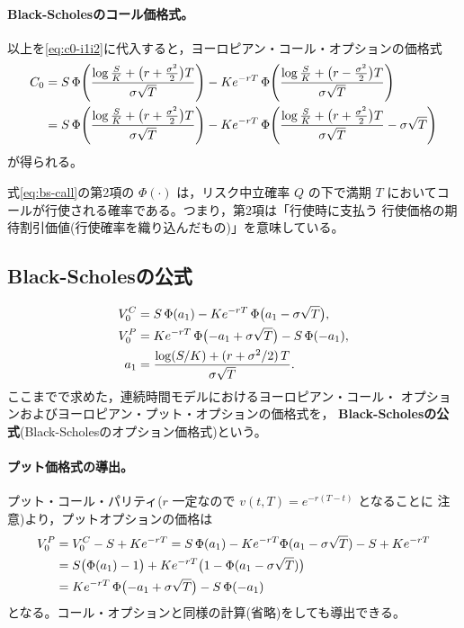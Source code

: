 \paragraph{Black-Scholesのコール価格式。}
以上を\eqref{eq:c0-i1i2}に代入すると，ヨーロピアン・コール・オプションの価格式
\begin{align}
C_0 &= S\,\Phi\Biggl(\frac{\log\frac{S}{K}
+ \bigl(r+\frac{\sigma^2}{2}\bigr)T}{\sigma\sqrt{T}}\Biggr)
- Ke^{-rT}\,\Phi\Biggl(\frac{\log\frac{S}{K}
+ \bigl(r-\frac{\sigma^2}{2}\bigr)T}{\sigma\sqrt{T}}\Biggr)\notag\\
&= S\,\Phi\Biggl(\frac{\log\frac{S}{K}
+ \bigl(r+\frac{\sigma^2}{2}\bigr)T}{\sigma\sqrt{T}}\Biggr)
- Ke^{-rT}\,\Phi\Biggl(\frac{\log\frac{S}{K}
+ \bigl(r+\frac{\sigma^2}{2}\bigr)T}{\sigma\sqrt{T}} - \sigma\sqrt{T}\Biggr)
\label{eq:bs-call}
\end{align}
が得られる。

\begin{remark}
式\eqref{eq:bs-call}の第2項の $\Phi(\cdot)$ は，リスク中立確率 $Q$ の下で満期
$T$ においてコールが行使される確率である。つまり，第2項は「行使時に支払う
行使価格の期待割引価値(行使確率を織り込んだもの)」を意味している。
\end{remark}

\vspace{18pt}

\subsection{Black-Scholesの公式}

\begin{keypoint}
\begin{align}
V_0^C &= S\,\Phi(a_1) - Ke^{-rT}\,\Phi\bigl(a_1 - \sigma\sqrt{T}\bigr),\notag\\
V_0^P &= Ke^{-rT}\,\Phi\bigl(-a_1+\sigma\sqrt{T}\bigr) - S\,\Phi(-a_1),\notag\\
a_1 &= \frac{\log(S/K) + (r + \sigma^2/2)\,T}{\sigma\sqrt{T}}.
\label{eq:bs-formula}
\end{align}
ここまでで求めた，連続時間モデルにおけるヨーロピアン・コール・
オプションおよびヨーロピアン・プット・オプションの価格式を，
\textbf{Black-Scholesの公式}(Black-Scholesのオプション価格式)という。
\end{keypoint}

\paragraph{プット価格式の導出。}
プット・コール・パリティ($r$ 一定なので $v(t,T) = e^{-r(T-t)}$ となることに
注意)より，プットオプションの価格は
\begin{align}
V_0^P &= V_0^C - S + Ke^{-rT}
= S\,\Phi(a_1) - Ke^{-rT}\Phi(a_1-\sigma\sqrt{T}) - S + Ke^{-rT}\notag\\
&= S\bigl(\Phi(a_1) - 1\bigr)
+ Ke^{-rT}\bigl(1 - \Phi(a_1-\sigma\sqrt{T})\bigr)\notag\\
&= Ke^{-rT}\,\Phi\bigl(-a_1 + \sigma\sqrt{T}\bigr) - S\,\Phi(-a_1)
\label{eq:bs-put}
\end{align}
となる。コール・オプションと同様の計算(省略)をしても導出できる。

